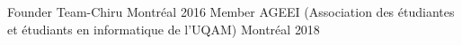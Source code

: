 \begin{cvhonors}
\cvhonor
    {Founder}
    {Team-Chiru}
    {Montréal}
    {2016}
  \cvhonor
    {Member}
    {AGEEI (Association des étudiantes et étudiants en informatique de l'UQAM)}
    {Montréal}
    {2018}

\end{cvhonors}
